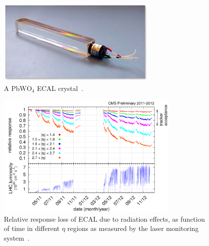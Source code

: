 \begin{figure}
\begin{center}
  \includegraphics[width=0.7\textwidth,keepaspectratio]{plots_and_figures/chapter3/crystal.jpg}
\caption{A $\mathrm{PbWO}_4$ ECAL crystal~\cite{ecal1}.}
\label{fig:ecal_crystal}
\end{center}
\end{figure}

\begin{figure}
\begin{center}
  \includegraphics[width=0.8\textwidth,keepaspectratio]{plots_and_figures/chapter3/ecal_laser_corr.png}
\caption{Relative response loss of ECAL due to radiation effects, as function of time in different $\eta$ regions as measured by the laser monitoring system~\cite{ecal2}.}
\label{fig:ecal_las_corr}
\end{center}
\end{figure}

